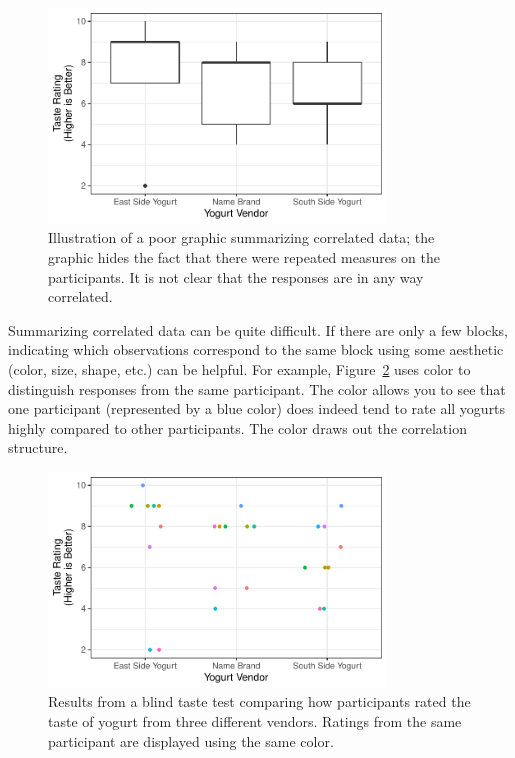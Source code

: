 \documentclass[
  letterpaper,
  DIV=11,
  numbers=noendperiod]{scrreprt}
\theoremstyle{definition}
\theoremstyle{definition}
\theoremstyle{plain}
\theoremstyle{remark}
\begin{document}
\begin{figure}

{\centering \includegraphics[width=0.8\textwidth,height=\textheight]{./images/fig-blocksummaries-bad-plot-1.pdf}

}

\caption{\label{fig-blocksummaries-bad-plot}Illustration of a poor
graphic summarizing correlated data; the graphic hides the fact that
there were repeated measures on the participants. It is not clear that
the responses are in any way correlated.}

\end{figure}

Summarizing correlated data can be quite difficult. If there are only a
few blocks, indicating which observations correspond to the same block
using some aesthetic (color, size, shape, etc.) can be helpful. For
example, Figure~\ref{fig-blocksummaries-color-plot} uses color to
distinguish responses from the same participant. The color allows you to
see that one participant (represented by a blue color) does indeed tend
to rate all yogurts highly compared to other participants. The color
draws out the correlation structure.

\begin{figure}

{\centering \includegraphics[width=0.8\textwidth,height=\textheight]{./images/fig-blocksummaries-color-plot-1.pdf}

}

\caption{\label{fig-blocksummaries-color-plot}Results from a blind taste
test comparing how participants rated the taste of yogurt from three
different vendors. Ratings from the same participant are displayed using
the same color.}

\end{figure}
\end{document}
